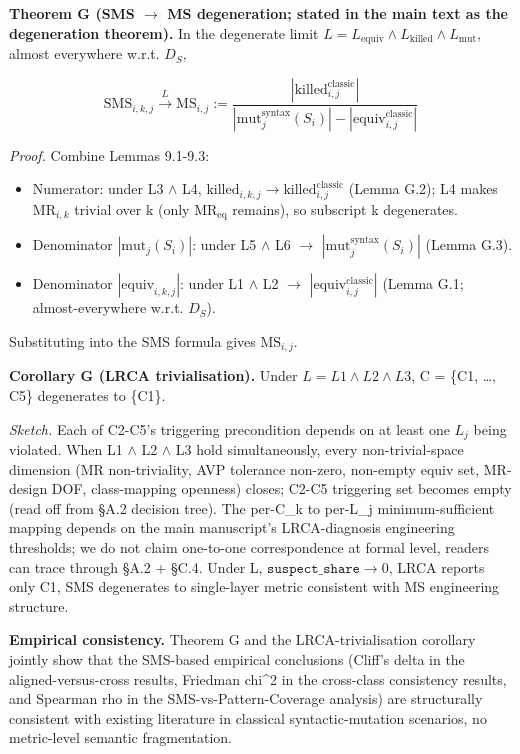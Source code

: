 \documentclass[manuscript,screen,review]{acmart}
\begin{document}
\textbf{Theorem G (SMS $\to$ MS degeneration; stated in the main text
as the degeneration theorem).} In the degenerate limit
$L = L_{\mathrm{equiv}} \wedge L_{\mathrm{killed}} \wedge L_{\mathrm{mut}}$, almost everywhere
w.r.t. $D_S$,

\[ \mathrm{SMS}_{i,k,j} \xrightarrow{L} \mathrm{MS}_{i,j} := \frac{|\mathrm{killed}_{i,j}^{\mathrm{classic}}|}{|\mathrm{mut}_j^{\mathrm{syntax}}(S_i)| - |\mathrm{equiv}_{i,j}^{\mathrm{classic}}|} \]

\emph{Proof.} Combine Lemmas 9.1-9.3:

\begin{itemize}

\item
  Numerator: under L3 $\wedge$ L4, $\mathrm{killed}_{i,k,j} \to
  \mathrm{killed}_{i,j}^{\mathrm{classic}}$ (Lemma G.2); L4 makes $\mathrm{MR}_{i,k}$ trivial
  over k (only $\mathrm{MR}_{\mathrm{eq}}$ remains), so subscript k degenerates.
\item
  Denominator $|\mathrm{mut}_j(S_i)|$: under L5 $\wedge$ L6 $\to$
  $|\mathrm{mut}_j^{\mathrm{syntax}}(S_i)|$ (Lemma G.3).
\item
  Denominator $|\mathrm{equiv}_{i,k,j}|$: under L1 $\wedge$ L2 $\to$
  $|\mathrm{equiv}_{i,j}^{\mathrm{classic}}|$ (Lemma G.1;
  almost-everywhere w.r.t. $D_S$).
\end{itemize}

Substituting into the SMS formula gives $\mathrm{MS}_{i,j}$.

\textbf{Corollary G (LRCA trivialisation).} Under $L = L1 \wedge L2 \wedge L3$, C
= \{C1, \ldots, C5\} degenerates to \{C1\}.

\emph{Sketch.} Each of C2-C5's triggering precondition depends on at
least one $L_j$ being violated. When L1 $\wedge$ L2 $\wedge$ L3 hold simultaneously,
every non-trivial-space dimension (MR non-triviality, AVP tolerance
non-zero, non-empty equiv set, MR-design DOF, class-mapping openness)
closes; C2-C5 triggering set becomes empty (read off from §A.2 decision
tree). The per-C\_k to per-L\_j minimum-sufficient mapping depends on
the main manuscript's LRCA-diagnosis engineering thresholds; we do not claim one-to-one
correspondence at formal level, readers can trace through §A.2 + §C.4.
Under L, $\texttt{suspect\_share} \to 0$, LRCA reports only C1, SMS degenerates to
single-layer metric consistent with \citet{jia2011analysis} MS engineering
structure.

\textbf{Empirical consistency.} Theorem G and the LRCA-trivialisation
corollary jointly
show that the SMS-based empirical conclusions (Cliff's delta in the aligned-versus-cross results,
Friedman chi\^{}2 in the cross-class consistency results, and Spearman rho in the SMS-vs-Pattern-Coverage analysis) are structurally consistent
with existing \citet{jia2011analysis} literature in classical
syntactic-mutation scenarios, no metric-level semantic fragmentation.
\end{document}
